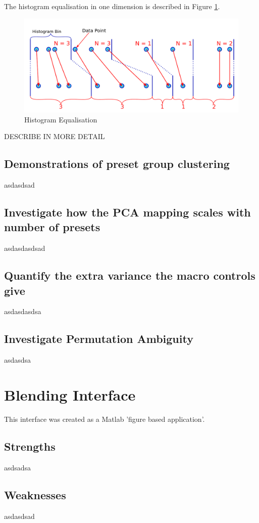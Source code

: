 \documentclass[11pt, oneside]{report}   	%
\begin{document}
The histogram equalisation in one dimension is described in Figure \ref{fig:HistEq}.
\begin{figure}[h] 
	\centering
	\includegraphics[width = 6in]{HistogramEquilisation.png}
	\caption{Histogram Equalisation}
	\label{fig:HistEq}
\end{figure}
DESCRIBE IN MORE DETAIL


\subsection{Demonstrations of preset group clustering}
asdasdsad
\subsection{Investigate how the PCA mapping scales with number of presets}
asdasdasdsad
\subsection{Quantify the extra variance the macro controls give}
asdasdasdsa
\subsection{Investigate Permutation Ambiguity}
asdasdsa

\section{Blending Interface}
This interface was created as a Matlab 'figure based application'.
\subsection{Strengths}
asdsadsa
\subsection{Weaknesses}
asdasdsad
\end{document}

